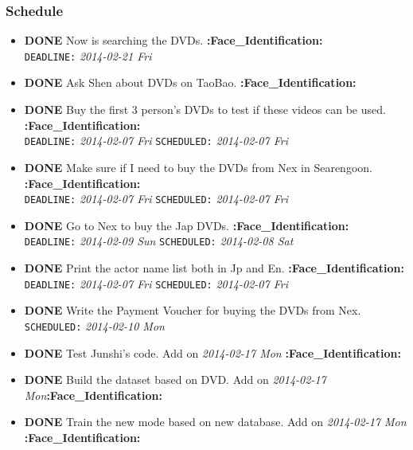 \documentclass[CJK]{cctart}
\begin{document}
\subsubsection{Schedule}
\label{sec-1-3-4}
\begin{itemize}

\item \textbf{DONE} Now is searching the DVDs. \textbf{:Face\_Identification:}\\
\label{sec-1-3-4-1}%
\texttt{DEADLINE:} \textit{2014-02-21 Fri}


\item \textbf{DONE} Ask Shen about DVDs on TaoBao. \textbf{:Face\_Identification:}
\label{sec-1-3-4-2}%

\item \textbf{DONE} Buy the first 3 person's DVDs to test if these videos can be used. \textbf{:Face\_Identification:}\\
\label{sec-1-3-4-3}%
\texttt{DEADLINE:} \textit{2014-02-07 Fri} \texttt{SCHEDULED:} \textit{2014-02-07 Fri}


\item \textbf{DONE} Make sure if I need to buy the DVDs from Nex in Searengoon. \textbf{:Face\_Identification:}\\
\label{sec-1-3-4-4}%
\texttt{DEADLINE:} \textit{2014-02-07 Fri} \texttt{SCHEDULED:} \textit{2014-02-07 Fri}


\item \textbf{DONE} Go to Nex to buy the Jap DVDs. \textbf{:Face\_Identification:}\\
\label{sec-1-3-4-5}%
\texttt{DEADLINE:} \textit{2014-02-09 Sun} \texttt{SCHEDULED:} \textit{2014-02-08 Sat}


\item \textbf{DONE} Print the actor name list both in Jp and En. \textbf{:Face\_Identification:}\\
\label{sec-1-3-4-6}%
\texttt{DEADLINE:} \textit{2014-02-07 Fri} \texttt{SCHEDULED:} \textit{2014-02-07 Fri}


\item \textbf{DONE} Write the Payment Voucher for buying the DVDs from Nex.\\
\label{sec-1-3-4-7}%
\texttt{SCHEDULED:} \textit{2014-02-10 Mon}


\item \textbf{DONE} Test Junshi's code. Add on \textit{2014-02-17 Mon} \textbf{:Face\_Identification:}
\label{sec-1-3-4-8}%

\item \textbf{DONE} Build the dataset based on DVD. Add on \textit{2014-02-17 Mon}\textbf{:Face\_Identification:}
\label{sec-1-3-4-9}%

\item \textbf{DONE} Train the new mode based on new database. Add on \textit{2014-02-17 Mon} \textbf{:Face\_Identification:}
\label{sec-1-3-4-10}%
\end{itemize} %
\end{document}
